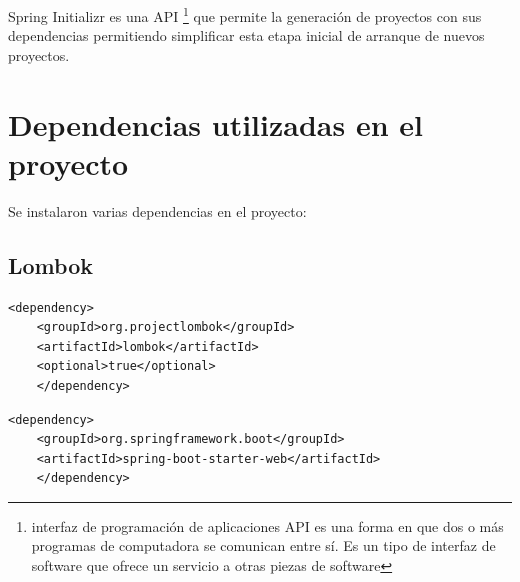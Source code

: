 Spring Initializr es una API \footnote{ interfaz de programación de aplicaciones API es una forma en que dos o más programas de computadora se comunican entre sí. Es un tipo de interfaz de software que ofrece un servicio a otras piezas de software} que permite la generación de proyectos con sus dependencias permitiendo simplificar esta etapa inicial de arranque de nuevos proyectos. 

\section{Dependencias utilizadas en el proyecto}
Se instalaron varias dependencias en el proyecto:
\subsection{Lombok}
\begin{verbatim}
<dependency>
	<groupId>org.projectlombok</groupId>
	<artifactId>lombok</artifactId>
	<optional>true</optional>
	</dependency>
\end{verbatim}

\begin{verbatim}
<dependency>
	<groupId>org.springframework.boot</groupId>
	<artifactId>spring-boot-starter-web</artifactId>
 	</dependency>
\end{verbatim}